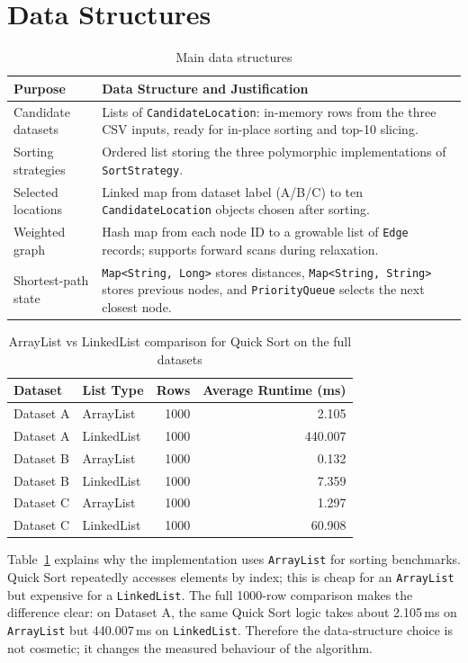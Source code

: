 \documentclass[12pt,a4paper,twocolumn,openany]{report}
\begin{document}
\section{Data Structures}
\begin{table}[t]
\centering
\caption{Main data structures}
\scriptsize
\begin{tabularx}{\textwidth}{lY}
\toprule
Purpose & Data Structure and Justification \\
\midrule
Candidate datasets & Lists of \texttt{CandidateLocation}: in-memory rows from the three CSV inputs, ready for in-place sorting and top-10 slicing. \\
Sorting strategies & Ordered list storing the three polymorphic implementations of \texttt{SortStrategy}. \\
Selected locations & Linked map from dataset label (A/B/C) to ten \texttt{CandidateLocation} objects chosen after sorting. \\
Weighted graph & Hash map from each node ID to a growable list of \texttt{Edge} records; supports forward scans during relaxation. \\
Shortest-path state & \texttt{Map<String, Long>} stores distances, \texttt{Map<String, String>} stores previous nodes, and \texttt{PriorityQueue} selects the next closest node. \\
\bottomrule
\end{tabularx}
\end{table}

\begin{table}[t]
\centering
\caption{ArrayList vs LinkedList comparison for Quick Sort on the full datasets}
\label{tab:data-structure-comparison}
\scriptsize
\begin{tabular}{llrr}
\toprule
Dataset & List Type & Rows & Average Runtime (ms) \\
\midrule
Dataset A & ArrayList & 1000 & 2.105 \\
Dataset A & LinkedList & 1000 & 440.007 \\
Dataset B & ArrayList & 1000 & 0.132 \\
Dataset B & LinkedList & 1000 & 7.359 \\
Dataset C & ArrayList & 1000 & 1.297 \\
Dataset C & LinkedList & 1000 & 60.908 \\
\bottomrule
\end{tabular}
\end{table}

Table~\ref{tab:data-structure-comparison} explains why the implementation uses \texttt{ArrayList} for sorting benchmarks. 
Quick Sort repeatedly accesses elements by index; this is cheap for an \texttt{ArrayList} but expensive for a \texttt{LinkedList}. 
The full 1000-row comparison makes the difference clear: on Dataset A, the same Quick Sort logic takes about 2.105\,ms on \texttt{ArrayList} but 440.007\,ms on \texttt{LinkedList}. 
Therefore the data-structure choice is not cosmetic; it changes the measured behaviour of the algorithm.
\end{document}
